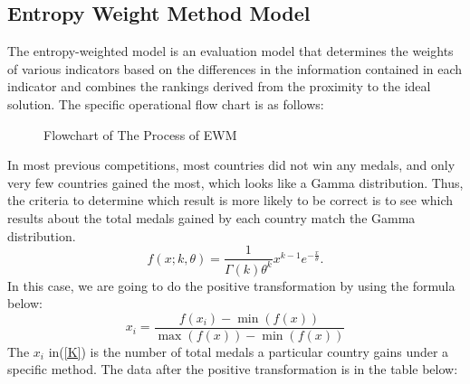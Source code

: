 \documentclass{mcmthesis}
\begin{document}
\subsection{Entropy Weight Method Model}
The entropy-weighted model is an evaluation model that determines the weights of various indicators based on the differences in the information contained in each indicator and combines the rankings derived from the proximity to the ideal solution. The specific operational flow chart is as follows:
\begin{figure}[H]
\centering
{}
\caption{Flowchart of The Process of EWM}
\label{fig:flowchart}
\end{figure}
In most previous competitions, most countries did not win any medals, and only very few countries gained the most, which looks like a Gamma distribution. Thus, the criteria to determine which result is more likely to be correct is to see which results about the total medals gained by each country match the Gamma distribution.\\
\begin{equation}\label{eq:1}
f(x;k,\theta) =\frac{1}{\Gamma(k) \theta^k}x^{k-1}e^{-\frac{x}{\theta}}.
\end{equation}
In this case, we are going to do the positive transformation by using the formula below:
\begin{equation}\label{K}
x_i = \frac{f(x_i) - \min(f(x))}{\max(f(x)) - \min(f(x))}
\end{equation}
The $x_i$ in(\ref{K}) is the number of total medals a particular country gains under a specific method. The data after the positive transformation is in the table below:
\end{document}
